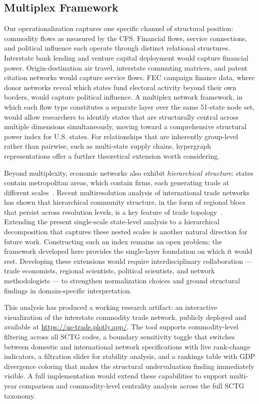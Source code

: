 \documentclass[12pt,oneside]{book}
\begin{document}
\subsection{Multiplex Framework}

Our operationalization captures one specific channel of structural position: commodity flows as measured by the CFS. Financial flows, service connections, and political influence each operate through distinct relational structures. Interstate bank lending and venture capital deployment would capture financial power. Origin-destination air travel, interstate commuting matrices, and patent citation networks would capture service flows. FEC campaign finance data, where donor networks reveal which states fund electoral activity beyond their own borders, would capture political influence. A multiplex network framework, in which each flow type constitutes a separate layer over the same 51-state node set, would allow researchers to identify states that are structurally central across multiple dimensions simultaneously, moving toward a comprehensive structural power index for U.S. states. For relationships that are inherently group-level rather than pairwise, such as multi-state supply chains, hypergraph representations offer a further theoretical extension worth considering. 

Beyond multiplexity, economic networks also exhibit \emph{hierarchical structure}: states contain metropolitan areas, which contain firms, each generating trade at different scales~\cite{simon_architecture_1962}. Recent multiresolution analysis of international trade networks has shown that hierarchical community structure, in the form of regional blocs that persist across resolution levels, is a key feature of trade topology~\cite{cho_multiresolution_2023}. Extending the present single-scale state-level analysis to a hierarchical decomposition that captures these nested scales is another natural direction for future work. Constructing such an index remains an open problem; the framework developed here provides the single-layer foundation on which it would rest. Developing these extensions would require interdisciplinary collaboration --- trade economists, regional scientists, political scientists, and network methodologists --- to strengthen normalization choices and ground structural findings in domain-specific interpretation.

This analysis has produced a working research artifact: an interactive visualization of the interstate commodity trade network, publicly deployed and available at \url{https://us-trade.plotly.app/}. The tool supports commodity-level filtering across all SCTG codes, a boundary sensitivity toggle that switches between domestic and international network specifications with live rank-change indicators, a filtration slider for stability analysis, and a rankings table with GDP divergence coloring that makes the structural undervaluation finding immediately visible. A full implementation would extend these capabilities to support multi-year comparison and commodity-level centrality analysis across the full SCTG taxonomy.
\end{document}
